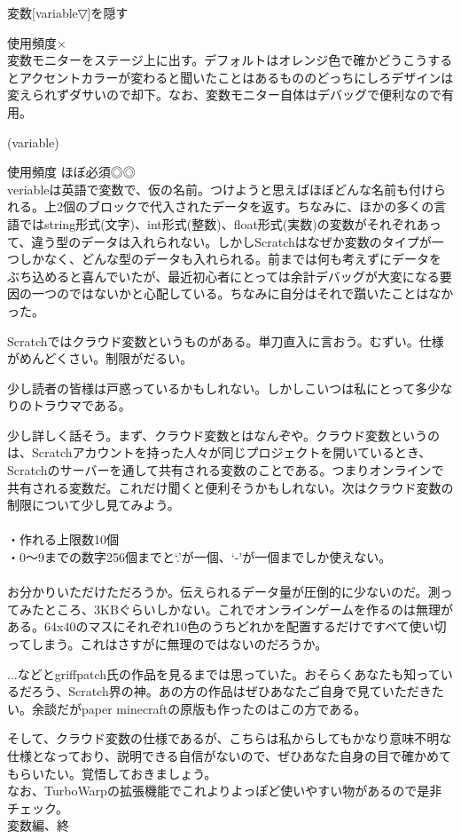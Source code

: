 \documentclass[b5paper,10pt]{jsarticle}
\begin{document}
\begin{multicols*}{3}
\begin{itembox}{3}
変数[variable▽]を隠す
\end{itembox}
使用頻度×\\
変数モニターをステージ上に出す。デフォルトはオレンジ色で確かどうこうするとアクセントカラーが変わると聞いたことはあるもののどっちにしろデザインは変えられずダサいので却下。なお、変数モニター自体はデバッグで便利なので有用。
\begin{itembox}{4}
(variable)
\end{itembox}
使用頻度 ほぼ必須◎◎\\
veriableは英語で変数で、仮の名前。つけようと思えばほぼどんな名前も付けられる。上2個のブロックで代入されたデータを返す。ちなみに、ほかの多くの言語ではstring形式(文字)、int形式(整数)、float形式(実数)の変数がそれぞれあって、違う型のデータは入れられない。しかしScratchはなぜか変数のタイプが一つしかなく、どんな型のデータも入れられる。前までは何も考えずにデータをぶち込めると喜んでいたが、最近初心者にとっては余計デバッグが大変になる要因の一つのではないかと心配している。ちなみに自分はそれで躓いたことはなかった。

Scratchではクラウド変数というものがある。単刀直入に言おう。むずい。仕様がめんどくさい。制限がだるい。

少し読者の皆様は戸惑っているかもしれない。しかしこいつは私にとって多少なりのトラウマである。

少し詳しく話そう。まず、クラウド変数とはなんぞや。クラウド変数というのは、Scratchアカウントを持った人々が同じプロジェクトを開いているとき、Scratchのサーバーを通して共有される変数のことである。つまりオンラインで共有される変数だ。これだけ聞くと便利そうかもしれない。次はクラウド変数の制限について少し見てみよう。\\\\
・作れる上限数10個\\
・0～9までの数字256個までと`.'が一個、`-'が一個までしか使えない。\\\\
お分かりいただけただろうか。伝えられるデータ量が圧倒的に少ないのだ。測ってみたところ、3KBぐらいしかない。これでオンラインゲームを作るのは無理がある。64x40のマスにそれぞれ10色のうちどれかを配置するだけですべて使い切ってしまう。これはさすがに無理のではないのだろうか。

...などとgriffpatch氏の作品を見るまでは思っていた。おそらくあなたも知っているだろう、Scratch界の神。あの方の作品はぜひあなたご自身で見ていただきたい。余談だがpaper minecraftの原版も作ったのはこの方である。

そして、クラウド変数の仕様であるが、こちらは私からしてもかなり意味不明な仕様となっており、説明できる自信がないので、ぜひあなた自身の目で確かめてもらいたい。覚悟しておきましょう。\\
なお、TurboWarpの拡張機能でこれよりよっぽど使いやすい物があるので是非チェック。\\
変数編、終


\end{multicols*}
\end{document}

